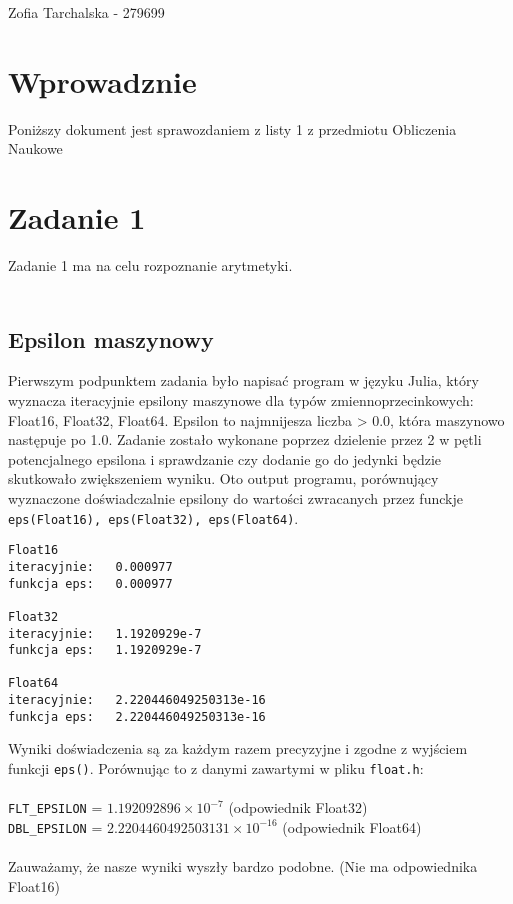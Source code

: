 \documentclass{article}
\begin{document}
\noindent Zofia Tarchalska - 279699
\section*{Wprowadznie}
Poniższy dokument jest sprawozdaniem z listy 1 z przedmiotu Obliczenia Naukowe

\section{Zadanie 1}
\noindent Zadanie 1 ma na celu rozpoznanie arytmetyki. \\\\
\subsection{Epsilon maszynowy}
Pierwszym podpunktem zadania było napisać program w języku Julia, który wyznacza iteracyjnie epsilony maszynowe dla typów zmiennoprzecinkowych: Float16, Float32, Float64. Epsilon to najmnijesza liczba > 0.0, która maszynowo następuje po 1.0. Zadanie zostało wykonane poprzez dzielenie przez 2 w pętli potencjalnego epsilona i sprawdzanie czy dodanie go do jedynki będzie skutkowało zwiększeniem wyniku. Oto output programu, porównujący wyznaczone doświadczalnie epsilony do wartości zwracanych przez funckje \texttt{eps(Float16), eps(Float32), eps(Float64)}. \\ 
\begin{verbatim}
Float16
iteracyjnie:   0.000977
funkcja eps:   0.000977

Float32
iteracyjnie:   1.1920929e-7
funkcja eps:   1.1920929e-7

Float64
iteracyjnie:   2.220446049250313e-16
funkcja eps:   2.220446049250313e-16

\end{verbatim}


\noindent Wyniki doświadczenia są za każdym razem precyzyjne i zgodne z wyjściem funkcji \texttt{eps()}. Porównując to z danymi zawartymi w pliku \texttt{float.h}: \\\\
\texttt{FLT\_EPSILON} = $1.192092896 \times 10^{-7}$ (odpowiednik Float32) \\ 
\texttt{DBL\_EPSILON} = $2.2204460492503131 \times 10^{-16}$ (odpowiednik Float64) \\\\
Zauważamy, że nasze wyniki wyszły bardzo podobne. (Nie ma odpowiednika Float16)
\end{document}
